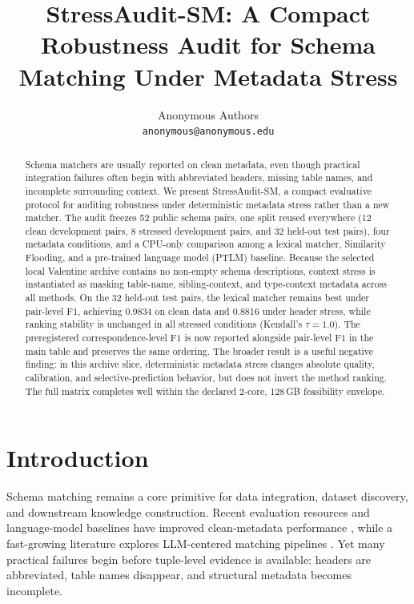 \documentclass{article}
\title{StressAudit-SM: A Compact Robustness Audit for Schema Matching Under Metadata Stress}
\author{
Anonymous Authors \\
\texttt{anonymous@anonymous.edu}
}
\newcommand{\stressaudit}{StressAudit-SM}
\newcommand{\fone}{\mbox{$\mathrm{F1}$}}
\begin{document}
\maketitle

\begin{abstract}
Schema matchers are usually reported on clean metadata, even though practical integration failures often begin with abbreviated headers, missing table names, and incomplete surrounding context. We present \stressaudit, a compact evaluative protocol for auditing robustness under deterministic metadata stress rather than a new matcher. The audit freezes 52 public schema pairs, one split reused everywhere (12 clean development pairs, 8 stressed development pairs, and 32 held-out test pairs), four metadata conditions, and a CPU-only comparison among a lexical matcher, Similarity Flooding, and a pre-trained language model (PTLM) baseline. Because the selected local Valentine archive contains no non-empty schema descriptions, context stress is instantiated as masking table-name, sibling-context, and type-context metadata across all methods. On the 32 held-out test pairs, the lexical matcher remains best under pair-level \fone{}, achieving 0.9834 on clean data and 0.8816 under header stress, while ranking stability is unchanged in all stressed conditions (Kendall's $\tau = 1.0$). The preregistered correspondence-level \fone{} is now reported alongside pair-level \fone{} in the main table and preserves the same ordering. The broader result is a useful negative finding: in this archive slice, deterministic metadata stress changes absolute quality, calibration, and selective-prediction behavior, but does not invert the method ranking. The full matrix completes well within the declared 2-core, 128\,GB feasibility envelope.
\end{abstract}

\section{Introduction}

Schema matching remains a core primitive for data integration, dataset discovery, and downstream knowledge construction. Recent evaluation resources and language-model baselines have improved clean-metadata performance \citep{koutras2021valentine,zhang2023schema}, while a fast-growing literature explores LLM-centered matching pipelines \citep{parciak2024schema,sheetrit2024rematch,seedat2024matchmaker,xu2024kcmf,wang2025llmatch}. Yet many practical failures begin before tuple-level evidence is available: headers are abbreviated, table names disappear, and structural metadata becomes incomplete.
\end{document}
